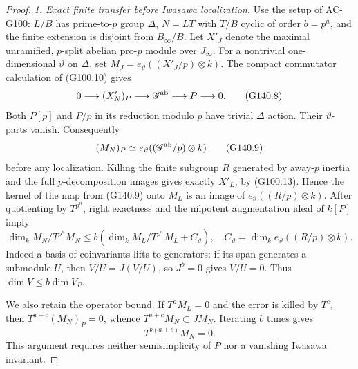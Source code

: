 \begin{proof}
\emph{1. Exact finite transfer before Iwasawa localization.}
Use the setup of AC-G100: $L/B$ has prime-to-$p$ group $\Delta$,
$N=LT$ with $T/B$ cyclic of order $b=p^u$, and the finite extension
is disjoint from $B_\infty/B$.  Let $X'_J$ denote the maximal
unramified, $p$-split abelian pro-$p$ module over $J_\infty$.
For a nontrivial one-dimensional $\vartheta$ on $\Delta$, set
$M_J=e_\vartheta((X'_J/p)\otimes k)$.
The compact commutator calculation of (G100.10) gives
\[
 0\longrightarrow (X'_N)_P\longrightarrow\mathscr G^{\rm ab}
       \longrightarrow P\longrightarrow0.
 \tag{G140.8}
\]
Both $P[p]$ and $P/p$ in its reduction modulo $p$ have trivial
$\Delta$ action.  Their $\vartheta$-parts vanish.  Consequently
\[
 (M_N)_P\simeq e_\vartheta((\mathscr G^{\rm ab}/p)\otimes k)
 \tag{G140.9}
\]
before any localization.  Killing the finite subgroup $R$ generated
by away-$p$ inertia and the full $p$-decomposition images gives
exactly $X'_L$, by (G100.13).  Hence the kernel of the map from
(G140.9) onto $M_L$ is an image of $e_\vartheta((R/p)\otimes k)$.
After quotienting by $T^{p^n}$, right exactness and the nilpotent
augmentation ideal of $k[P]$ imply
\[
 \dim_k M_N/T^{p^n}M_N
 \le b\left(\dim_k M_L/T^{p^n}M_L+C_\vartheta\right),
 \quad C_\vartheta=\dim_k e_\vartheta((R/p)\otimes k).
 \tag{G140.10}
\]
Indeed a basis of coinvariants lifts to generators: if its span
generates a submodule $U$, then $V/U=J(V/U)$, so $J^b=0$ gives
$V/U=0$.  Thus $\dim V\le b\dim V_P$.

We also retain the operator bound.  If $T^aM_L=0$ and the error
is killed by $T^c$, then $T^{a+c}(M_N)_P=0$, whence
$T^{a+c}M_N\subset JM_N$.  Iterating $b$ times gives
\[
                         T^{b(a+c)}M_N=0.
 \tag{G140.11}
\]
This argument requires neither semisimplicity of $P$ nor a
vanishing Iwasawa invariant.


\end{proof}
